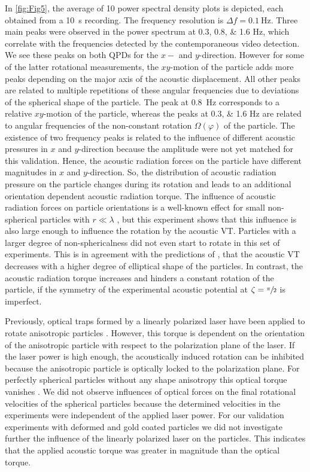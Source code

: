 In \cref{fig:Fig5}, the average of 10 power spectral density plots is depicted, 
each obtained from a \SI{10}{\second} recording. The frequency resolution is 
$\Delta f=\SI{0.1}{\hertz}$. Three main peaks were observed in the power 
spectrum at \numlist{0.3; 0.8; 1.6} \si{\hertz}, which correlate with the 
frequencies detected by the contemporaneous video detection. We see these peaks 
on both QPDs for the $x-$ and $y$-direction. However for some of the latter 
rotational measurements, the $xy$-motion of the particle adds more peaks 
depending on the major axis of the acoustic displacement. All other peaks are 
related to multiple repetitions of these angular frequencies due to deviations 
of the spherical shape of the particle.  The peak at \SI{0.8}{\hertz} 
corresponds to a relative $xy$-motion of the particle, whereas the peaks at 
\numlist{0.3; 1.6} \si{\hertz} are related to angular frequencies of the 
non-constant rotation $\Omega(\varphi)$ of the particle. The existence of two 
frequency peaks is related to the influence of different acoustic pressures in 
$x$ and $y$-direction because the amplitude were not yet matched for this 
validation.  Hence, the acoustic radiation forces on the particle have different 
magnitudes in $x$ and $y$-direction. So, the distribution of acoustic radiation 
pressure on the particle changes during its rotation and leads to an additional 
orientation dependent acoustic radiation torque.  The influence of acoustic 
radiation forces on particle orientations is a well-known effect for small 
non-spherical particles with $r \ll \lambda$ \cite{konig1891,garbin2015}, but 
this experiment shows that this influence is also large enough to influence the 
rotation by the acoustic VT.  Particles with a larger degree of 
non-sphericalness did not even start to rotate in this set of experiments. This 
is in agreement with the predictions of \citeauthor{hahn2016} \cite{hahn2016}, 
that the acoustic VT decreases with a higher degree of elliptical shape of the 
particles. In contrast, the acoustic radiation torque increases and hinders a 
constant rotation of the particle, if the symmetry of the experimental acoustic 
potential at $\zeta= \sfrac{\pi}{2}$ is imperfect.

Previously, optical traps formed by a linearly polarized laser have been applied 
to rotate anisotropic particles \cite{GutirezMedina2010}. However, this torque 
is dependent on the orientation of the anisotropic particle with respect to the 
polarization plane of the laser. If the laser power is high enough, the 
acoustically induced rotation can be inhibited because the anisotropic particle 
is optically locked to the polarization plane. For perfectly spherical particles 
without any shape anisotropy this optical torque vanishes 
\cite{Manzo2006,Friese1998}. We did not observe influences of optical forces on 
the final rotational velocities of the spherical particles because the 
determined velocities in the experiments were independent of the applied laser 
power. For our validation experiments with deformed and gold coated particles we 
did not investigate further the influence of the linearly polarized laser on the 
particles. This indicates that the applied acoustic torque was greater in 
magnitude than the optical torque.

